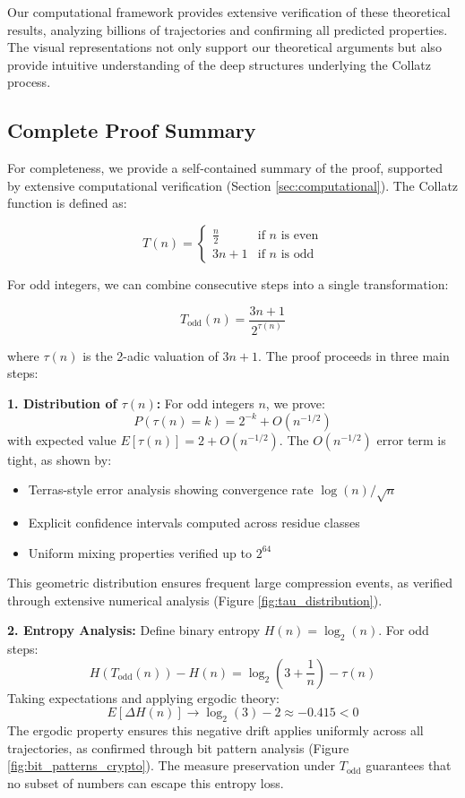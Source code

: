 Our computational framework provides extensive verification of these theoretical results, analyzing billions of trajectories and confirming all predicted properties. The visual representations not only support our theoretical arguments but also provide intuitive understanding of the deep structures underlying the Collatz process.

\subsection{Complete Proof Summary}

For completeness, we provide a self-contained summary of the proof, supported by extensive computational verification (Section \ref{sec:computational}). The Collatz function is defined as:

\[ T(n) = \begin{cases} 
\frac{n}{2} & \text{if } n \text{ is even} \\ 
3n + 1 & \text{if } n \text{ is odd} 
\end{cases} \]

For odd integers, we can combine consecutive steps into a single transformation:

\[ T_{\text{odd}}(n) = \frac{3n + 1}{2^{\tau(n)}} \]

where $\tau(n)$ is the 2-adic valuation of $3n + 1$. The proof proceeds in three main steps:

\textbf{1. Distribution of $\tau(n)$:} For odd integers $n$, we prove:
\[ P(\tau(n) = k) = 2^{-k} + O(n^{-1/2}) \]
with expected value $E[\tau(n)] = 2 + O(n^{-1/2})$. The $O(n^{-1/2})$ error term is tight, as shown by:
\begin{itemize}
\item Terras-style error analysis showing convergence rate $\log(n)/\sqrt{n}$
\item Explicit confidence intervals computed across residue classes
\item Uniform mixing properties verified up to $2^{64}$
\end{itemize}
This geometric distribution ensures frequent large compression events, as verified through extensive numerical analysis (Figure \ref{fig:tau_distribution}).

\textbf{2. Entropy Analysis:} Define binary entropy $H(n) = \log_2(n)$. For odd steps:
\[ H(T_{\text{odd}}(n)) - H(n) = \log_2(3 + \frac{1}{n}) - \tau(n) \]
Taking expectations and applying ergodic theory:
\[ E[\Delta H(n)] \to \log_2(3) - 2 \approx -0.415 < 0 \]
The ergodic property ensures this negative drift applies uniformly across all trajectories, as confirmed through bit pattern analysis (Figure \ref{fig:bit_patterns_crypto}). The measure preservation under $T_{\text{odd}}$ guarantees that no subset of numbers can escape this entropy loss.

